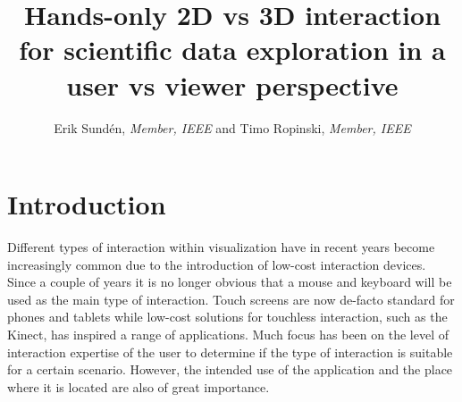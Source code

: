 \documentclass[review,journal]{vgtc}         %
\title{Hands-only 2D vs 3D interaction for scientific data exploration in a user vs viewer perspective}
\author{Erik Sund\'en, \textit{Member, IEEE} and Timo Ropinski, \textit{Member, IEEE}}
\begin{document}

\maketitle

\section{Introduction}\label{sec:introduction}
Different types of interaction within visualization have in recent years become increasingly common due to the introduction of low-cost interaction devices.
Since a couple of years it is no longer obvious that a mouse and keyboard will be used as the main type of interaction. 
Touch screens are now de-facto standard for phones and tablets while low-cost solutions for touchless interaction, such as the Kinect, has inspired a range of applications. 
Much focus has been on the level of interaction expertise of the user to determine if the type of interaction is suitable for a certain scenario.
However, the intended use of the application and the place where it is located are also of great importance. 
\end{document}
